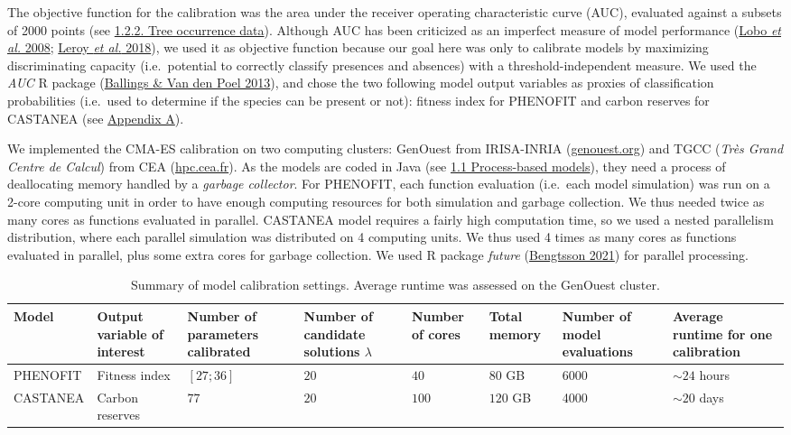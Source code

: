 \documentclass[11pt,]{article}
\begin{document}
The objective function for the calibration was the area under the
receiver operating characteristic curve (AUC), evaluated against a
subsets of 2000 points (see \protect\hyperlink{occurrencedata}{1.2.2.
Tree occurrence data}). Although AUC has been criticized as an imperfect
measure of model performance (\protect\hyperlink{ref-Lobo2008}{Lobo
\emph{et al.} 2008}; \protect\hyperlink{ref-Leroy2018}{Leroy \emph{et
al.} 2018}), we used it as objective function because our goal here was
only to calibrate models by maximizing discriminating capacity
(i.e.~potential to correctly classify presences and absences) with a
threshold-independent measure. We used the \emph{AUC} R package
(\protect\hyperlink{ref-Ballings2013}{Ballings \& Van den Poel 2013}),
and chose the two following model output variables as proxies of
classification probabilities (i.e.~used to determine if the species can
be present or not): fitness index for PHENOFIT and carbon reserves for
CASTANEA (see \protect\hyperlink{appendixA}{Appendix A}).

We implemented the CMA-ES calibration on two computing clusters:
GenOuest from IRISA-INRIA
(\href{https://www.genouest.org}{genouest.org}) and TGCC (\emph{Très
Grand Centre de Calcul}) from CEA
(\href{http://www-hpc.cea.fr/fr/complexe/tgcc.htm}{hpc.cea.fr}). As the
models are coded in Java (see \protect\hyperlink{pbmodels}{1.1
Process-based models}), they need a process of deallocating memory
handled by a \emph{garbage collector}. For PHENOFIT, each function
evaluation (i.e.~each model simulation) was run on a 2-core computing
unit in order to have enough computing resources for both simulation and
garbage collection. We thus needed twice as many cores as functions
evaluated in parallel. CASTANEA model requires a fairly high computation
time, so we used a nested parallelism distribution, where each parallel
simulation was distributed on 4 computing units. We thus used 4 times as
many cores as functions evaluated in parallel, plus some extra cores for
garbage collection. We used R package \emph{future}
(\protect\hyperlink{ref-Bengtsson2021}{Bengtsson 2021}) for parallel
processing.

\begin{table}

\caption{\label{tab:modelstable}Summary of model calibration settings. Average runtime was assessed on the GenOuest cluster.}
\centering
\begin{tabu} to 
\toprule
Model & Output variable of interest & Number of parameters calibrated & Number of candidate solutions $\lambda$ & Number of cores & Total memory & Number of model evaluations & Average runtime for one calibration\\
\midrule
PHENOFIT & Fitness index & $[27;36]$ & $20$ & $40$ & $80$ GB & 6000 & $\sim 24$ hours\\
\addlinespace
CASTANEA & Carbon reserves & $77$ & $20$ & $100$ & $120$ GB & 4000 & $\sim 20$ days\\
\bottomrule
\end{tabu}
\end{table}
\end{document}
